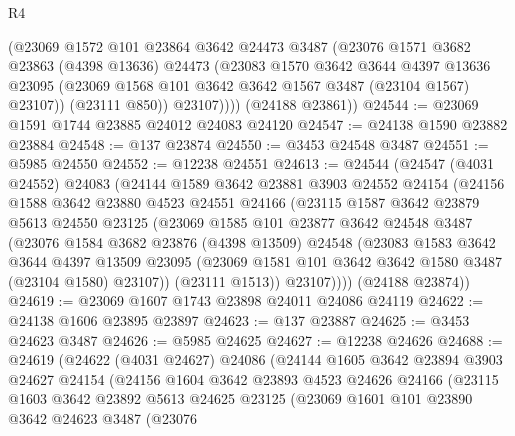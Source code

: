 \begin{lexlean}{R4}
\begin{coremodule}
            (@23069
              @1572
              @101
              @23864
              @3642
              @24473
              @3487
              (@23076
                @1571
                @3682
                @23863
                (@4398 @13636)
                @24473
                (@23083
                  @1570
                  @3642
                  @3644
                  @4397
                  @13636
                  @23095
                  (@23069 @1568 @101 @3642 @3642 @1567 @3487 (@23104 @1567) @23107))
                (@23111 @850))
              @23107))))
      (@24188 @23861))
@24544 := @23069 @1591 @1744 @23885 @24012 @24083 @24120
@24547 := @24138 @1590 @23882 @23884
@24548 := @137 @23874
@24550 := @3453 @24548 @3487
@24551 := @5985 @24550
@24552 := @12238 @24551
@24613 := @24544
    (@24547
      (@4031 @24552)
      @24083
      (@24144
        @1589
        @3642
        @23881
        @3903
        @24552
        @24154
        (@24156
          @1588
          @3642
          @23880
          @4523
          @24551
          @24166
          (@23115
            @1587
            @3642
            @23879
            @5613
            @24550
            @23125
            (@23069
              @1585
              @101
              @23877
              @3642
              @24548
              @3487
              (@23076
                @1584
                @3682
                @23876
                (@4398 @13509)
                @24548
                (@23083
                  @1583
                  @3642
                  @3644
                  @4397
                  @13509
                  @23095
                  (@23069 @1581 @101 @3642 @3642 @1580 @3487 (@23104 @1580) @23107))
                (@23111 @1513))
              @23107))))
      (@24188 @23874))
@24619 := @23069 @1607 @1743 @23898 @24011 @24086 @24119
@24622 := @24138 @1606 @23895 @23897
@24623 := @137 @23887
@24625 := @3453 @24623 @3487
@24626 := @5985 @24625
@24627 := @12238 @24626
@24688 := @24619
    (@24622
      (@4031 @24627)
      @24086
      (@24144
        @1605
        @3642
        @23894
        @3903
        @24627
        @24154
        (@24156
          @1604
          @3642
          @23893
          @4523
          @24626
          @24166
          (@23115
            @1603
            @3642
            @23892
            @5613
            @24625
            @23125
            (@23069
              @1601
              @101
              @23890
              @3642
              @24623
              @3487
              (@23076

\end{coremodule}
\end{lexlean}
